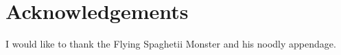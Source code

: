 \section*{Acknowledgements}

I would like to thank the Flying Spaghetii Monster and his noodly appendage.

\newpage